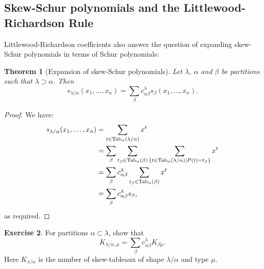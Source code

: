 \documentclass[11pt]{amsproc}
\newtheorem{theorem}{Theorem}[subsection]
\theoremstyle{definition}
\theoremstyle{example}
\newtheorem{exercise}[theorem]{Exercise}
\newcommand{\Tab}{\textup{Tab}}
\begin{document}
\subsection{Skew-Schur polynomials and the Littlewood-Richardson Rule}
\label{sec:skew-lr}
Littlewood-Richardson coefficients also answer the question of expanding skew-Schur polynomials in terms of Schur polynomials:
\begin{theorem}
  [Expansion of skew-Schur polynomials]
  \label{theorem:skew-exp}
  Let $\lambda$, $\alpha$ and $\beta$ be partitions such that $\lambda\supset \alpha$.
  Then
  \begin{displaymath}
    s_{\lambda/\alpha}(x_1,\dotsc,x_n) = \sum_\beta c^\lambda_{\alpha\beta}s_\beta(x_1,\dotsc,x_n).
  \end{displaymath}
\end{theorem}
\begin{proof}
  We have:
  \begin{align*}
    s_{\lambda/\alpha}(x_1,\dotsc,x_n) & = \sum_{t\in \Tab_n(\lambda/\alpha)} x^t\\
      & = \sum_\beta \sum_{t_\beta\in \Tab_n(\beta)} \sum_{\{t\in \Tab_n(\lambda/\alpha)\mid P(t)=t_\beta\}} x^t\\
      & = \sum_\beta c^\lambda_{\alpha\beta} \sum_{t_\beta\in \Tab_n(\beta)} x^t\\
      & = \sum_\beta c^\lambda_{\alpha\beta} s_\beta,
  \end{align*}
  as required.
\end{proof}
\begin{exercise}
  For partitions $\alpha\subset \lambda$, show that
  \begin{displaymath}
    K_{\lambda/\alpha,\mu} = \sum_\beta c^\lambda_{\alpha\beta} K_{\beta\mu}.
  \end{displaymath}
  Here $K_{\lambda/\alpha}$ is the number of skew-tableaux of shape $\lambda/\alpha$ and type $\mu$.
\end{exercise}
\end{document}
